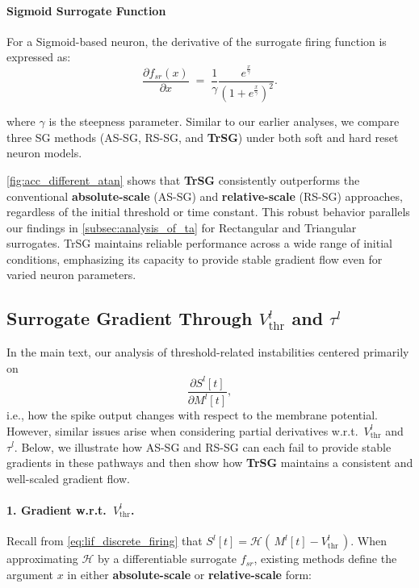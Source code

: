 \paragraph{Sigmoid Surrogate Function}
For a Sigmoid-based neuron, the derivative of the surrogate firing function is expressed as:
\[
    \frac{\partial f_{sr}(x)}{\partial x}
    \;=\; 
    \frac{1}{\gamma}\frac{e^{\frac{x}{\gamma}}}{(1+e^{\frac{x}{\gamma}})^2}.
\]

where \(\gamma\) is the steepness parameter. Similar to our earlier analyses, we compare three SG methods (AS-SG, RS-SG, and \textbf{TrSG}) under both soft and hard reset neuron models.

\cref{fig:acc_different_atan} shows that \textbf{TrSG} consistently outperforms the conventional \textbf{absolute-scale} (AS-SG) and \textbf{relative-scale} (RS-SG) approaches, regardless of the initial threshold or time constant. This robust behavior parallels our findings in \cref{subsec:analysis_of_ta} for Rectangular and Triangular surrogates. TrSG maintains reliable performance across a wide range of initial conditions, emphasizing its capacity to provide stable gradient flow even for varied neuron parameters.

\subsection{Surrogate Gradient Through \texorpdfstring{\(V_{\text{thr}}^l\) and \(\tau^l\)}{}}
\label{subsec:grad_vthr_tau}

In the main text, our analysis of threshold-related instabilities centered primarily on 
\[
\frac{\partial S^l[t]}{\partial M^l[t]},
\]
i.e., how the spike output changes with respect to the membrane potential. 
However, similar issues arise when considering partial derivatives w.r.t.\ \(V_{\text{thr}}^l\) and \(\tau^l\). 
Below, we illustrate how AS-SG and RS-SG can each fail to provide stable gradients in these pathways and then show how \textbf{TrSG} maintains a consistent and well-scaled gradient flow.

\paragraph{1. Gradient w.r.t.\ \texorpdfstring{\(V_{\text{thr}}^l\)}{Vthr}.}
Recall from \cref{eq:lif_discrete_firing} that
\(
S^l[t] = \mathcal{H}(\,M^l[t] - V_{\text{thr}}^l\,)
\).
When approximating \(\mathcal{H}\) by a differentiable surrogate \(f_{sr}\), existing methods define the argument \(x\) in either \textbf{absolute-scale} or \textbf{relative-scale} form:

